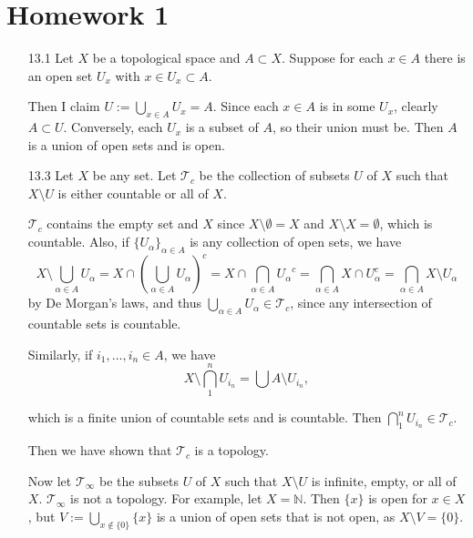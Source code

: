 \documentclass[11pt, reqno]{article}
\begin{document}
\topmargin=-40pt
\renewcommand{\headrulewidth}{1pt}
\renewcommand{\headsep}{20pt}
\thispagestyle{fancy}

\section*{Homework 1}

\begin{enumerate}
    \item[13.1] Let $X$ be a topological space and $A \subset X$. Suppose for each $x \in A$ there is an open 
    set $U_x$ with $x \in U_x \subset A$. 

    Then I claim $U := \bigcup_{x \in A} U_x = A$. Since each $x \in A$ is in some $U_x$, clearly $A \subset U$.
    Conversely, each $U_x$ is a subset of $A$, so their union must be. Then $A$ is a union of open sets 
    and is open.

    \item[13.3] Let $X$ be any set. Let $\mathcal{T}_c$ be the collection of subsets $U$ of $X$ such that 
    $X \setminus U$ is either countable or all of $X$. 

    $\mathcal{T}_c$ contains the empty set and $X$ since $X \setminus \emptyset = X$ and $X \setminus X = \emptyset$,
    which is countable. Also, if ${\{U_\alpha\}}_{\alpha \in A}$ is any collection of open sets,
    we have 
    \[
    X \setminus \bigcup_{\alpha \in A}U_\alpha = X \cap \left(\bigcup_{\alpha \in A}U_\alpha\right)^c 
    = X \cap \bigcap_{\alpha \in A}{U_\alpha}^c = \bigcap_{\alpha \in A}X \cap U_\alpha^c = 
    \bigcap_{\alpha \in A}X \setminus U_\alpha
    \]
    by De Morgan's laws, and thus $\bigcup_{\alpha \in A}U_\alpha \in \mathcal{T}_c$, since 
    any intersection of countable sets is countable.

    Similarly, if $i_1, \dots, i_n \in A$, we have 
    \[
    X\setminus \bigcap_1^n U_{i_n} = \bigcup A\setminus U_{i_n},
    \]

    which is a finite union of countable sets and is countable. Then $\bigcap_1^n U_{i_n} \in \mathcal{T}_c$.

    Then we have shown that $\mathcal{T}_c$ is a topology.

    Now let $\mathcal{T}_\infty$ be the subsets $U$ of $X$ such that $X \setminus U$ is infinite, empty,
    or all of $X$. $\mathcal{T}_\infty$ is not a topology. For example, let $X = \mathbb{N}$. Then
    $\{x\}$ is open for $x \in X$, but $V := \bigcup_{x \notin \{0\}}\{x\}$ is a union of open sets 
    that is not open, as $X \setminus V = \{0\}$. 


\end{enumerate}
\end{document}
